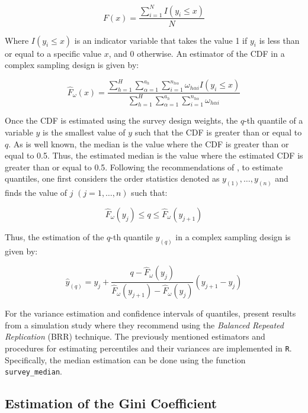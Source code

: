 \documentclass[
  12pt,
]{book}
\begin{document}
\[
F\left(x\right) = \frac{{ \sum_{i=1}^{N}}I\left(y_{i}\leq x\right)}{N}
\]

Where \(I\left(y_{i}\leq x\right)\) is an indicator variable that takes the value 1 if \(y_{i}\) is less than or equal to a specific value \(x\), and 0 otherwise. An estimator of the CDF in a complex sampling design is given by:

\[
\hat{F}_{\omega}\left(x\right) = \frac{\sum_{h=1}^{H}\sum_{\alpha=1}^{a_{h}}\sum_{i=1}^{n_{h\alpha}}\omega_{h\alpha i}I\left(y_{i}\leq x\right)}{\sum_{h=1}^{H}\sum_{\alpha=1}^{a_{h}}\sum_{i=1}^{n_{h\alpha}}\omega_{h\alpha i}}
\]

Once the CDF is estimated using the survey design weights, the \(q\)-th quantile of a variable \(y\) is the smallest value of \(y\) such that the CDF is greater than or equal to \(q\). As is well known, the median is the value where the CDF is greater than or equal to 0.5. Thus, the estimated median is the value where the estimated CDF is greater than or equal to 0.5. Following the recommendations of \citet{Heeringa_West_Berglund_2017}, to estimate quantiles, one first considers the order statistics denoted as \(y_{(1)},\ldots,y_{(n)}\) and finds the value of \(j\) \((j=1,\ldots,n)\) such that:

\[
\hat{F}_{\omega}\left(y_{j}\right)\leq q\leq\hat{F}_{\omega}\left(y_{j+1}\right)
\]

Thus, the estimation of the \(q\)-th quantile \(y_{(q)}\) in a complex sampling design is given by:

\[
\hat{y}_{(q)} = y_{j}+\frac{q-\hat{F}_{\omega}\left(y_{j}\right)}{\hat{F}_{\omega}\left(y_{j+1}\right)-\hat{F}_{\omega}\left(y_{j}\right)}\left(y_{j+1}-y_{j}\right)
\]

For the variance estimation and confidence intervals of quantiles, \citet{kovar1988bootstrap} present results from a simulation study where they recommend using the \emph{Balanced Repeated Replication} (BRR) technique. The previously mentioned estimators and procedures for estimating percentiles and their variances are implemented in \texttt{R}. Specifically, the median estimation can be done using the function \texttt{survey\_median}.

\hypertarget{estimation-of-the-gini-coefficient}{%
\subsection{Estimation of the Gini Coefficient}\label{estimation-of-the-gini-coefficient}}
\end{document}
